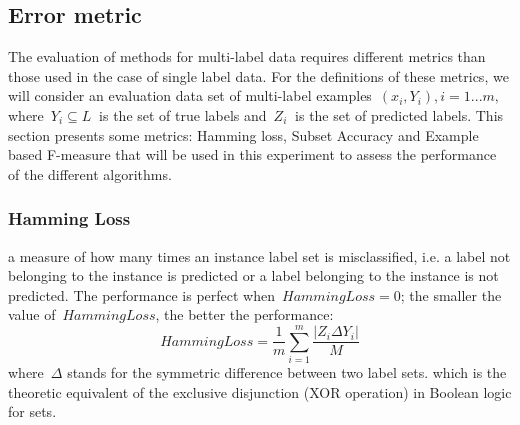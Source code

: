 \documentclass[11pt]{article}
\begin{document}
\subsection{Error metric}\label{sec:eval-meas-princ}

The evaluation of methods for multi-label data requires different metrics than those used in the case of single label data. For the definitions of these metrics, we will consider an evaluation data set of multi-label examples~$(x_i ,Y_i ), i = 1...m, $ where~$ Y_i \subseteq L~$ is the set of true labels and~$ Z_i~$ is the set of predicted labels. This section presents some metrics: Hamming loss, Subset Accuracy and Example based F-measure \cite{Tsoumakas2010MLD} that will be used in this experiment to
assess the performance of the different algorithms. 



\subsubsection{Hamming Loss} a measure of how many times an instance label set is misclassified, i.e. a label not belonging to the instance is predicted or a label belonging to the instance is not predicted. The performance is perfect when~$Hamming Loss=0$; the smaller the value of~$Hamming Loss$, the better the performance:
\begin{equation} 
 Hamming Loss= \frac{1}{m}\sum_{i=1}^{m}  \frac{|Z_i\Delta Y_i|}{M}
\end{equation}
where~$\Delta$ stands for the symmetric difference between two label sets. which is the theoretic equivalent of the exclusive disjunction (XOR operation) in Boolean logic for sets.
\end{document}
